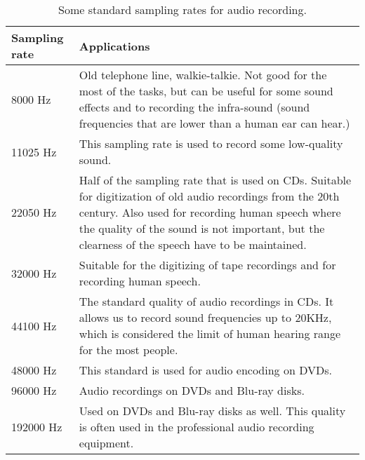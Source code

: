 \documentclass[../sparc.tex]{subfiles}
\begin{document}
\begin{table}[h]
  \centering
  \begin{tabular}{p{2cm}|p{9cm}}
    Sampling rate & Applications \\
    \hline \hline

    8000 Hz & Old telephone line, walkie-talkie.  Not good for the most of the
    tasks, but can be useful for some sound effects and to recording the
    infra-sound (sound frequencies that are lower than a human ear can hear.) \\

    \hline

    11025 Hz & This sampling rate is used to record some low-quality sound. \\

    \hline

    22050 Hz & Half of the sampling rate that is used on CDs.  Suitable for
    digitization of old audio recordings from the 20th century.  Also used for
    recording human speech where the quality of the sound is not important, but
    the clearness of the speech have to be maintained. \\

    \hline

    32000 Hz & Suitable for the digitizing of tape recordings and for recording
    human speech. \\

    \hline

    44100 Hz & The standard quality of audio recordings in CDs.  It allows us to
    record sound frequencies up to 20KHz, which is considered the limit of human
    hearing range for the most people. \\

    \hline

    48000 Hz & This standard is used for audio encoding on DVDs. \\

    \hline

    96000 Hz & Audio recordings on DVDs and Blu-ray disks. \\

    \hline

    192000 Hz & Used on DVDs and Blu-ray disks as well.  This quality is often
    used in the professional audio recording equipment. \\

    \hline

  \end{tabular}
  \caption{Some standard sampling rates for audio recording.}
  \label{table:adc-sound-sampling-rate-1}
\end{table}
\end{document}
